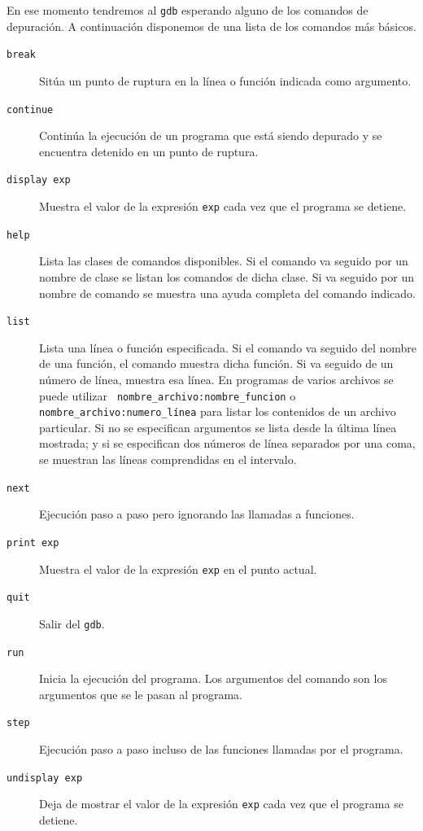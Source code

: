 En ese momento tendremos al {\tt gdb} esperando alguno de los comandos
de depuración.  A con\-ti\-nua\-ción  disponemos de  una lista  de los
comandos más básicos.

\begin{description}

\item[{\tt break}]  Sitúa un punto  de ruptura  en la línea  o función
indicada como argumento.

\item[{\tt continue}]  Continúa la ejecución  de un programa  que está
siendo depurado y se encuentra detenido en un punto de ruptura.

\item[{\tt display  exp}] Muestra el  valor de la expresión  {\tt exp}
cada vez que el programa se detiene.

\item[{\tt  help}] Lista  las clases  de comandos  disponibles. Si  el
comando va  seguido por un nombre  de clase se listan  los comandos de
dicha clase.  Si va seguido  por un nombre  de comando se  muestra una
ayuda completa del comando indicado.

\item[{\tt  list}]  Lista una  línea  o  función especificada.  Si  el
comando  va seguido  del nombre  de  una función,  el comando  muestra
dicha  función. Si  va  seguido de  un número  de  línea, muestra  esa
línea.  En  programas  de  varios  archivos  se  puede  utilizar  {\tt
nombre\_archivo:nombre\_funcion} o {\tt nombre\_archivo:numero\_línea}
para  listar  los  contenidos  de  un archivo  particular.  Si  no  se
especifican argumentos se  lista desde la última línea  mostrada; y si
se  especifican  dos números  de  línea  separados  por una  coma,  se
muestran las líneas comprendidas en el intervalo.

\item[{\tt next}] Ejecución paso a  paso pero ignorando las llamadas a
funciones.

\item[{\tt print exp}]  Muestra el valor de la expresión  {\tt exp} en
el punto actual.

\item[{\tt quit}] Salir del {\tt gdb}.

\item[{\tt run}] Inicia la ejecución  del programa. Los argumentos del
comando son los argumentos que se le pasan al programa.

\item[{\tt  step}] Ejecución  paso  a paso  incluso  de las  funciones
llamadas por el programa.

\item[{\tt undisplay  exp}] Deja de  mostrar el valor de  la expresión
{\tt exp} cada vez que el programa se detiene.

\end{description}

